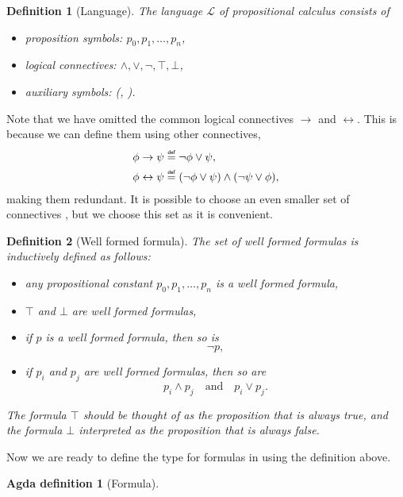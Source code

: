 \documentclass[titlepage]{article}
\newcommand\myeq{\mathrel{\overset{\makebox[0pt]{\mbox{\normalfont\tiny\sffamily def}}}{=}}}
\newtheorem{definition}{Definition}[section]
\newtheorem{agdadef}{Agda definition}
\begin{document}
\begin{definition}[Language]\label{language}
    The language $\mathcal{L}$ of propositional calculus consists of
    \begin{itemize}
        \item proposition symbols: $p_0,p_1,\hdots,p_n$,
        \item logical connectives: $\wedge,\vee,\neg,\top,\bot$,
        \item auxiliary symbols: (, ).
    \end{itemize}
\end{definition}
Note that we have omitted the common logical connectives $\rightarrow$ and $\leftrightarrow$. This is because we can define them using other connectives, 
\begin{align*}
    \phi \rightarrow \psi &\myeq \neg \phi \vee \psi, \\
    \phi \leftrightarrow \psi &\myeq (\neg \phi \vee \psi) \wedge (\neg \psi \vee \phi),
\end{align*}making them redundant. It is possible to choose an even smaller set of connectives \cite{vanDalen}, but we choose this set as it is convenient.

\begin{definition}[Well formed formula]\label{wellformed}
    The set of well formed formulas is inductively defined as follows:
    \begin{itemize}
        \item any propositional constant $p_0,p_1,\hdots,p_n$ is a well formed formula,
        \item $\top$ and $\bot$ are well formed formulas,
        \item if $p$ is a well formed formula, then so is
        $$\neg p,$$
        \item if $p_i$ and $p_j$ are well formed formulas, then so are
            $$p_i \wedge p_j \quad \text{and} \quad p_i \vee p_j.$$
    \end{itemize}
    The formula $\top$ should be thought of as the proposition that is always true, and the formula $\bot$ interpreted as the proposition that is always false.
\end{definition}

Now we are ready to define the type for formulas in \Agda using the definition above.
\begin{agdadef}[Formula]$ $
\end{agdadef}
\end{document}
